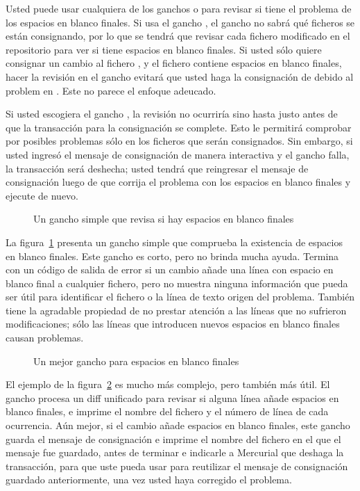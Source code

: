 Usted puede usar cualquiera de los ganchos  o
 para revisar si tiene el problema de los espacios
en blanco finales. Si usa el gancho , el gancho no
sabrá qué ficheros se están consignando, por lo que se tendrá que
revisar cada fichero modificado en el repositorio para ver si tiene
espacios en blanco finales. Si usted sólo quiere consignar un cambio
al fichero , y el fichero  contiene
espacios en blanco finales, hacer la revisión en el gancho
 evitará que usted haga la consignación de
 debido al problem en .  Este no parece el
enfoque adeucado.

Si usted escogiera el gancho , la revisión no
ocurriría sino hasta justo antes de que la transacción para la
consignación se complete. Esto le permitirá comprobar por posibles
problemas sólo en los ficheros que serán consignados. Sin embargo, si
usted ingresó el mensaje de consignación de manera interactiva y el
gancho falla, la transacción será deshecha; usted tendrá que
reingresar el mensaje de consignación luego de que corrija el problema
con los espacios en blanco finales y ejecute  de nuevo.

\begin{figure}[ht]
  \caption{Un gancho simple que revisa si hay espacios en blanco
  finales}
  \label{ex:hook:ws.simple}
\end{figure}

La figura~\ref{ex:hook:ws.simple} presenta un gancho
 simple que comprueba la existencia de espacios en
blanco finales. Este gancho es corto, pero no brinda mucha ayuda.
Termina con un código de salida de error si un cambio añade una línea
con espacio en blanco final a cualquier fichero, pero no muestra
ninguna información que pueda ser útil para identificar el fichero o
la línea de texto origen del problema. También tiene la agradable
propiedad de no prestar atención a las líneas que no sufrieron
modificaciones; sólo las líneas que introducen nuevos espacios en
blanco finales causan problemas.

\begin{figure}[ht]
  \caption{Un mejor gancho para espacios en blanco finales}
  \label{ex:hook:ws.better}
\end{figure}

El ejemplo de la figura~\ref{ex:hook:ws.better} es mucho más complejo,
pero también más útil. El gancho procesa un diff unificado para
revisar si alguna línea añade espacios en blanco finales, e imprime el
nombre del fichero y el número de línea de cada ocurrencia. Aún mejor,
si el cambio añade espacios en blanco finales, este gancho guarda el
mensaje de consignación e imprime el nombre del fichero en el que el
mensaje fue guardado, antes de terminar e indicarle a Mercurial que
deshaga la transacción, para que uste pueda usar
 para
reutilizar el mensaje de consignación guardado anteriormente, una vez
usted haya corregido el problema.

